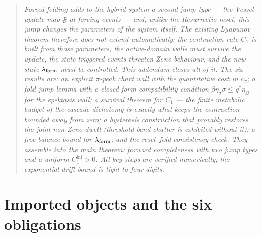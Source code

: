 \documentclass[11pt,a4paper,oneside]{book}
\newcommand{\lf}{\lambda_{\rm form}}
\newcommand{\fold}{\mathfrak{F}}
\theoremstyle{plain}
\theoremstyle{definition}
\theoremstyle{remark}
\begin{document}
\begin{quote}\small\itshape
Forced folding adds to the hybrid system a second jump type --- the Vessel update map $\fold$ at forcing
events --- and, unlike the Resurrectio reset, this jump changes the \emph{parameters} of the system
itself. The existing Lyapunov theorem therefore does not extend automatically: the contraction rate
$C_1$ is built from those parameters, the active-domain walls must survive the update, the
state-triggered events threaten Zeno behaviour, and the new state $\lf$ must be controlled. This
addendum closes all of it. The six results are: an explicit $\pi$-peak chart wall with the quantitative
cost in $c_\Psi$; a fold-jump lemma with a closed-form compatibility condition
$\beta\eta_\sigma\bar\sigma\le q^\ast\eta_\Omega$ for the epektasis wall; a survival theorem for $C_1$
--- the finite metabolic budget of the cascade dichotomy is exactly what keeps the contraction bounded
away from zero; a hysteresis construction that provably restores the joint non-Zeno dwell (threshold-band
chatter is exhibited without it); a free balance-bound for $\lf$; and the reset--fold consistency check.
They assemble into the main theorem: forward completeness with two jump types and a uniform
$C_1^{\inf}>0$. All key steps are verified numerically; the exponential drift bound is tight to four
digits.
\end{quote}

\section{Imported objects and the six obligations}
\end{document}
